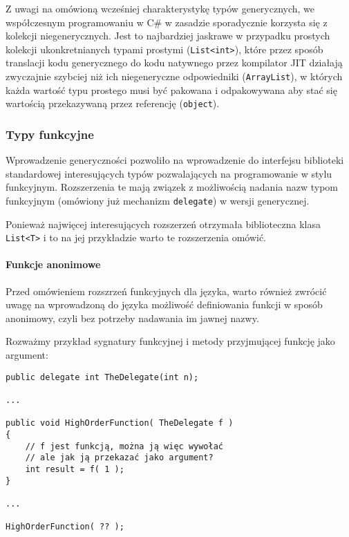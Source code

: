 Z uwagi na omówioną wcześniej charakterystykę typów generycznych, 
we współczesnym programowaniu w C\# w zasadzie sporadycznie korzysta się z kolekcji niegenerycznych. Jest to
najbardziej jaskrawe w przypadku prostych kolekcji ukonkretnianych typami prostymi ({\tt List<int>}), które przez
sposób translacji kodu generycznego do kodu natywnego przez kompilator JIT działają zwyczajnie szybciej niż
ich niegeneryczne odpowiedniki ({\tt ArrayList}), w których każda wartość typu prostego musi być pakowana i odpakowywana
aby stać się wartością przekazywaną przez referencję ({\tt object}).

\subsubsection{Typy funkcyjne}
\label{typy_funkcyjne_2_0}

Wprowadzenie generyczności pozwoliło na wprowadzenie do interfejsu biblioteki standardowej interesujących typów pozwalających na programowanie w stylu funkcyjnym.
Rozszerzenia te mają związek z możliwością nadania nazw typom funkcyjnym (omówiony już mechanizm {\tt delegate}) w wersji generycznej.

Ponieważ najwięcej interesujących rozszerzeń otrzymała biblioteczna klasa {\tt List<T>} i to na jej przykładzie warto te rozszerzenia omówić.

\paragraph{Funkcje anonimowe}

Przed omówieniem rozszrzeń funkcyjnych dla języka, warto również zwrócić uwagę na wprowadzoną do języka możliwość definiowania funkcji w sposób anonimowy, czyli
bez potrzeby nadawania im jawnej nazwy.

Rozważmy przykład sygnatury funkcyjnej i metody przyjmującej funkcję jako argument:

\begin{scriptsize}
\begin{verbatim}
public delegate int TheDelegate(int n);

...

public void HighOrderFunction( TheDelegate f )
{
    // f jest funkcją, można ją więc wywołać
    // ale jak ją przekazać jako argument?
    int result = f( 1 );
}

...

HighOrderFunction( ?? );
\end{verbatim}
\end{scriptsize}

